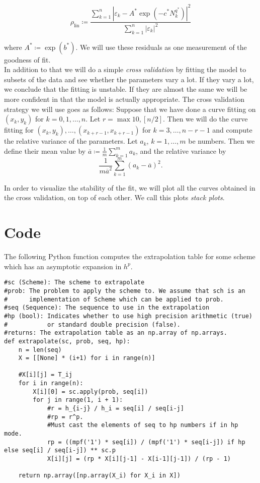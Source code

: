 \[
\rho_{\operatorname{lin}}\coloneqq \frac{\sum_{k=1}^n|\varepsilon_k - A^*\exp(-c^*N_k^{q^*})|^2}{\sum_{k=1}^n|\varepsilon_k|^2}
\]

where \(A^*\coloneqq \exp(b^*)\). We will use these residuals as one measurement of the goodness of fit.\\

In addition to that we will do a simple {\it cross validation} by fitting the model to subsets of the data and see whether the parameters vary a lot. If they vary a lot, we conclude that the fitting is unstable. If they are almost the same we will be more confident in that the model is actually appropriate. The cross validation strategy we will use goes as follows: Suppose that we have done a curve fitting on \((x_k,y_k)\) for \(k=0,1,\ldots,n\). Let \(r = \max{10, [n/2]}\). Then we will do the curve fitting for \((x_k,y_k), \ldots, (x_{k+r-1},x_{k+r-1})\) for \(k=3,\ldots,n-r-1\) and compute the relative variance of the parameters. Let \(a_k\), \(k=1,\ldots, m\) be numbers. Then we define their mean value by \(\overline{a} \coloneqq \frac{1}{m}\sum_{k=1}^m a_k\), and the relative variance by 
\[
\frac{1}{m\overline{a}^2}\sum_{k=1}^m (a_k - \overline{a})^2. 
\]

In order to visualize the stability of the fit, we will plot all the curves obtained in the cross validation, on top of each other. We call this plots {\it stack plots}. 
\section{Code}

The following Python function computes the extrapolation table for some scheme which has an asymptotic expansion in \(h^p\).

\begin{verbatim}
#sc (Scheme): The scheme to extrapolate	
#prob: The problem to apply the scheme to. We assume that sch is an 
#      implementation of Scheme which can be applied to prob.
#seq (Sequence): The sequence to use in the extrapolation
#hp (bool): Indicates whether to use high precision arithmetic (true) 
#           or standard double precision (false).
#returns: The extrapolation table as an np.array of np.arrays.
def extrapolate(sc, prob, seq, hp):
	n = len(seq)
	X = [[None] * (i+1) for i in range(n)]

	#X[i][j] = T_ij
	for i in range(n):
		X[i][0] = sc.apply(prob, seq[i])
		for j in range(1, i + 1):
			#r = h_{i-j} / h_i = seq[i] / seq[i-j]
			#rp = r^p.
			#Must cast the elements of seq to hp numbers if in hp mode.
			rp = ((mpf('1') * seq[i]) / (mpf('1') * seq[i-j]) if hp else seq[i] / seq[i-j]) ** sc.p
			X[i][j] = (rp * X[i][j-1] - X[i-1][j-1]) / (rp - 1)

	return np.array([np.array(X_i) for X_i in X])
\end{verbatim}
